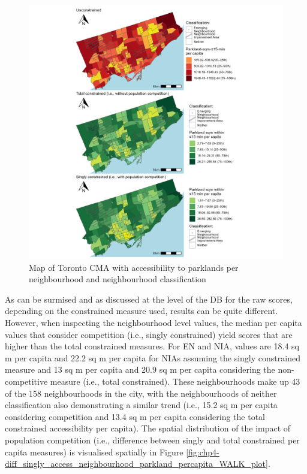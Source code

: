 \documentclass[
11pt, %
oneside, %
english, %
singlespacing, %
]{macthesis} %
\begin{document}
\begin{figure}

{\centering \includegraphics[width=6in]{./data/figures/chp4-parkland_access_neighbourhood_percapita_WALK_plots} 

}

\caption{\label{fig:chp4-parkland_access_neighbourhood_percapita_WALK_plots.png}Map of Toronto CMA with accessibility to parklands per neighbourhood and neighbourhood classification}\label{fig:unnamed-chunk-61}
\end{figure}

As can be surmised and as discussed at the level of the DB for the raw scores, depending on the constrained measure used, results can be quite different. However, when inspecting the neighbourhood level values, the median per capita values that consider competition (i.e., singly constrained) yield scores that are higher than the total constrained measures. For EN and NIA, values are 18.4 sq m per capita and 22.2 sq m per capita for NIAs assuming the singly constrained measure and 13 sq m per capita and 20.9 sq m per capita considering the non-competitive measure (i.e., total constrained). These neighbourhoods make up 43 of the 158 neighbourhoods in the city, with the neighbourhoods of neither classification also demonstrating a similar trend (i.e., 15.2 sq m per capita considering competition and 13.4 sq m per capita considering the total constrained accessibility per capita). The spatial distribution of the impact of population competition (i.e., difference between singly and total constrained per capita measures) is visualised spatially in Figure \ref{fig:chp4-diff_singly_access_neighbourhood_parkland_percapita_WALK_plot}.
\end{document}
